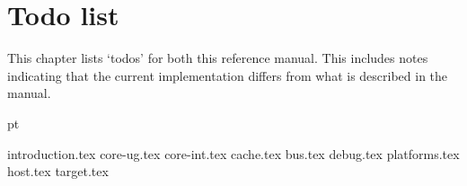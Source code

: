 \documentclass[11pt,twoside]{ce}
\newcommand{\rvex}{$\rho$-VEX}
\begin{document}



\setcounter{page}{1}


\tableofcontents



\chapter*{Todo list}

This chapter lists `todos' for both this reference manual. This includes notes
indicating that the current implementation differs from what is described in the
manual.

 pt

\makeatletter
{}
\makeatother



{introduction.tex}
{core-ug.tex}
{core-int.tex}
{cache.tex}
{bus.tex}
{debug.tex}
{platforms.tex}
{host.tex}
{target.tex}






\end{document}
